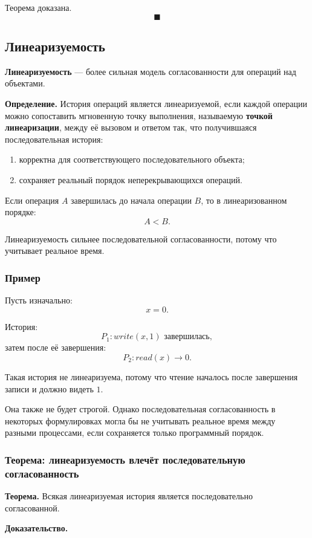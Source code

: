\documentclass[12pt,a4paper]{article}
\begin{document}
Теорема доказана.
\[
\blacksquare
\]

\subsection{Линеаризуемость}

\textbf{Линеаризуемость} --- более сильная модель согласованности для операций над объектами.

\textbf{Определение.}
История операций является линеаризуемой, если каждой операции можно сопоставить мгновенную точку выполнения, называемую \textbf{точкой линеаризации}, между её вызовом и ответом так, что получившаяся последовательная история:
\begin{enumerate}
    \item корректна для соответствующего последовательного объекта;
    \item сохраняет реальный порядок неперекрывающихся операций.
\end{enumerate}

Если операция $A$ завершилась до начала операции $B$, то в линеаризованном порядке:
\[
A < B.
\]

Линеаризуемость сильнее последовательной согласованности, потому что учитывает реальное время.

\subsubsection{Пример}

Пусть изначально:
\[
x = 0.
\]

История:
\[
P_1: write(x,1) \text{ завершилась},
\]
затем после её завершения:
\[
P_2: read(x) \rightarrow 0.
\]

Такая история не линеаризуема, потому что чтение началось после завершения записи и должно видеть $1$.

Она также не будет строгой. Однако последовательная согласованность в некоторых формулировках могла бы не учитывать реальное время между разными процессами, если сохраняется только программный порядок.

\subsubsection{Теорема: линеаризуемость влечёт последовательную согласованность}

\textbf{Теорема.}
Всякая линеаризуемая история является последовательно согласованной.

\textbf{Доказательство.}
\end{document}
